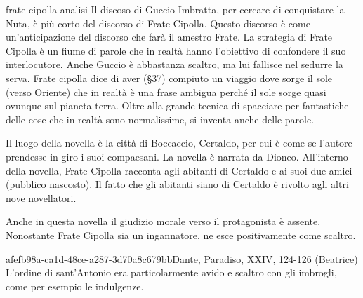 \documentclass[preview]{standalone}
\begin{document}
\begin{snippet}{frate-cipolla-analisi}
    Il discoso di Guccio Imbratta, per cercare di conquistare la Nuta, è più corto del discorso di Frate Cipolla.
    Questo discorso è come un'anticipazione del discorso che farà il amestro Frate.
    La strategia di Frate Cipolla è un fiume di parole che in realtà hanno l'obiettivo di confondere il suo interlocutore.
    Anche Guccio è abbastanza scaltro, ma lui fallisce nel sedurre la serva.
    Frate cipolla dice di aver (§37) compiuto un viaggio dove sorge il sole (verso Oriente)
    che in realtà è una frase ambigua perché il sole sorge quasi ovunque sul pianeta terra.
    Oltre alla grande tecnica di spacciare per fantastiche delle cose che in realtà sono normalissime,
    si inventa anche delle parole.
    
    Il luogo della novella è la città di Boccaccio, Certaldo, per cui è come se l'autore prendesse in giro i suoi compaesani.
    La novella è narrata da Dioneo.
    All'interno della novella, Frate Cipolla racconta agli abitanti di Certaldo e ai suoi due amici (pubblico nascosto).
    Il fatto che gli abitanti siano di Certaldo è rivolto agli altri nove novellatori.
    
    Anche in questa novella il giudizio morale verso il protagonista è assente.
    Nonostante Frate Cipolla sia un ingannatore, ne esce positivamente come scaltro.
\end{snippet}

\begin{snote}{afefb98a-ca1d-48ce-a287-3d70a8c679bb}{Dante, Paradiso, XXIV, 124-126 (Beatrice)}
    L'ordine di sant'Antonio era particolarmente avido e scaltro con gli imbrogli,
    come per esempio le indulgenze.
\end{snote}
\end{document}

